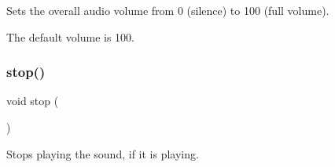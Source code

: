 Sets the overall audio volume from 0 (silence) to 100 (full volume). 

The default volume is 100. \mbox{\label{classSound_a8c528baf37154d347366083f0f816846}} 
\subsubsection{\texorpdfstring{stop()}{stop()}}
{\footnotesize\ttfamily void stop (\begin{DoxyParamCaption}{ }\end{DoxyParamCaption})\hspace{0.3cm}{\ttfamily [static]}}



Stops playing the sound, if it is playing. 

